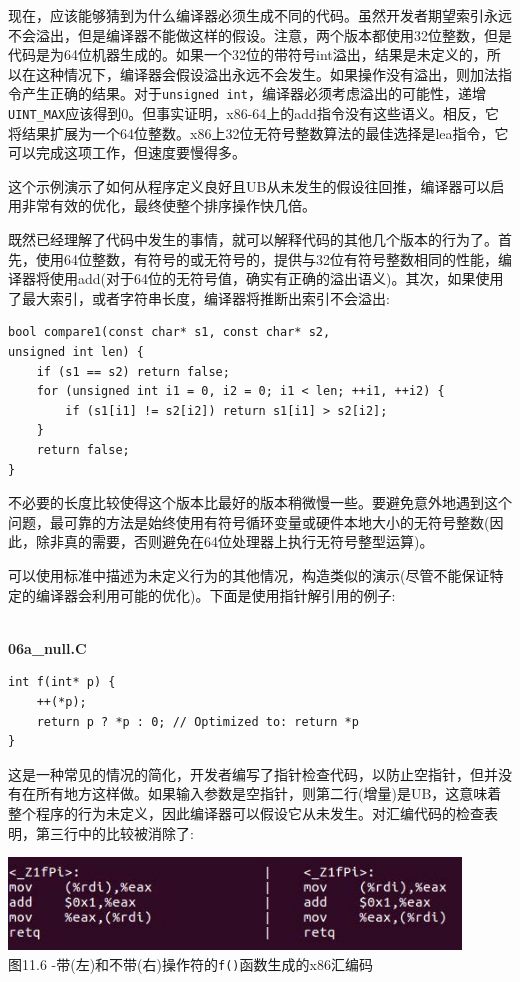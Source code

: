 现在，应该能够猜到为什么编译器必须生成不同的代码。虽然开发者期望索引永远不会溢出，但是编译器不能做这样的假设。注意，两个版本都使用32位整数，但是代码是为64位机器生成的。如果一个32位的带符号int溢出，结果是未定义的，所以在这种情况下，编译器会假设溢出永远不会发生。如果操作没有溢出，则加法指令产生正确的结果。对于\texttt{unsigned int}，编译器必须考虑溢出的可能性，递增\texttt{UINT\_MAX}应该得到0。但事实证明，x86-64上的add指令没有这些语义。相反，它将结果扩展为一个64位整数。x86上32位无符号整数算法的最佳选择是lea指令，它可以完成这项工作，但速度要慢得多。

这个示例演示了如何从程序定义良好且UB从未发生的假设往回推，编译器可以启用非常有效的优化，最终使整个排序操作快几倍。

既然已经理解了代码中发生的事情，就可以解释代码的其他几个版本的行为了。首先，使用64位整数，有符号的或无符号的，提供与32位有符号整数相同的性能，编译器将使用add(对于64位的无符号值，确实有正确的溢出语义)。其次，如果使用了最大索引，或者字符串长度，编译器将推断出索引不会溢出:

\begin{lstlisting}[style=styleCXX]
bool compare1(const char* s1, const char* s2,
unsigned int len) {
	if (s1 == s2) return false;
	for (unsigned int i1 = 0, i2 = 0; i1 < len; ++i1, ++i2) {
		if (s1[i1] != s2[i2]) return s1[i1] > s2[i2];
	}
	return false;
}
\end{lstlisting}

不必要的长度比较使得这个版本比最好的版本稍微慢一些。要避免意外地遇到这个问题，最可靠的方法是始终使用有符号循环变量或硬件本地大小的无符号整数(因此，除非真的需要，否则避免在64位处理器上执行无符号整型运算)。

可以使用标准中描述为未定义行为的其他情况，构造类似的演示(尽管不能保证特定的编译器会利用可能的优化)。下面是使用指针解引用的例子:

\hspace*{\fill} \\ %
\noindent
\textbf{06a\_null.C}
\begin{lstlisting}[style=styleCXX]
int f(int* p) {
	++(*p);
	return p ? *p : 0; // Optimized to: return *p
}
\end{lstlisting}

这是一种常见的情况的简化，开发者编写了指针检查代码，以防止空指针，但并没有在所有地方这样做。如果输入参数是空指针，则第二行(增量)是UB，这意味着整个程序的行为未定义，因此编译器可以假设它从未发生。对汇编代码的检查表明，第三行中的比较被消除了:

\begin{center}
\includegraphics[width=0.9\textwidth]{content/3/chapter11/images/6.jpg}\\
图11.6 -带(左)和不带(右)操作符的\texttt{f()}函数生成的x86汇编码
\end{center}

